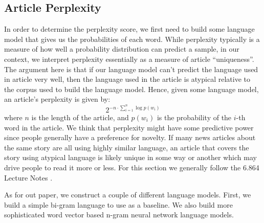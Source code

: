 \documentclass[fleqn,12pt]{SelfArx} %
\begin{document}
\subsection{Article Perplexity}
In order to determine the perplexity score, we first need to build some language model that gives us the probabilities of each word. While perplexity typically is a measure of how well a probability distribution can predict a sample, in our context, we interpret perplexity essentially as a measure of article “uniqueness”. The argument here is that if our language model can’t predict the language used in article very well, then the language used in the article is atypical relative to the corpus used to build the language model. Hence, given some language model, an article's perplexity is given by:
\begin{equation}
	2^{-n\cdot\sum_{i=1}^n \log p(w_i)}
\end{equation}
where $n$ is the length of the article, and $p(w_i)$ is the probability of the $i$-th word in the article. We think that perplexity might have some predictive power since people generally have a preference for novelty. If many news articles about the same story are all using highly similar language, an article that covers the story using atypical language is likely unique in some way or another which may drive people to read it more or less. For this section we generally follow the 6.864 Lecture Notes \cite{6864Lec23}.

As for out paper, we construct a couple of different language models. First, we build a simple bi-gram language to use as a baseline. We also build more sophisticated word vector based n-gram neural network language models.
\end{document}
